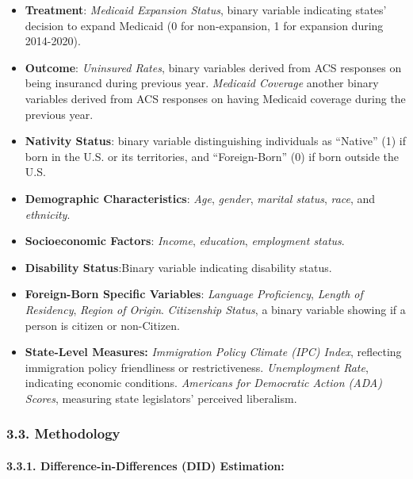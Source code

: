 \documentclass[
]{article}
\begin{document}
\begin{itemize}
\item
  \textbf{Treatment}: \emph{Medicaid Expansion Status}, binary variable
  indicating states' decision to expand Medicaid (0 for non-expansion, 1
  for expansion during 2014-2020).
\item
  \textbf{Outcome}: \emph{Uninsured Rates}, binary variables derived
  from ACS responses on being insurancd during previous year.
  \emph{Medicaid Coverage} another binary variables derived from ACS
  responses on having Medicaid coverage during the previous year.
\item
  \textbf{Nativity Status}: binary variable distinguishing individuals
  as ``Native'' (1) if born in the U.S. or its territories, and
  ``Foreign-Born'' (0) if born outside the U.S.
\item
  \textbf{Demographic Characteristics}: \emph{Age}, \emph{gender},
  \emph{marital status}, \emph{race}, and \emph{ethnicity}.
\item
  \textbf{Socioeconomic Factors}: \emph{Income}, \emph{education},
  \emph{employment status}.
\item
  \textbf{Disability Status}:Binary variable indicating disability
  status.
\item
  \textbf{Foreign-Born Specific Variables}: \emph{Language Proficiency},
  \emph{Length of Residency}, \emph{Region of Origin}. \emph{Citizenship
  Status}, a binary variable showing if a person is citizen or
  non-Citizen.
\item
  \textbf{State-Level Measures:} \emph{Immigration Policy Climate (IPC)
  Index}, reflecting immigration policy friendliness or restrictiveness.
  \emph{Unemployment Rate}, indicating economic conditions.
  \emph{Americans for Democratic Action (ADA) Scores}, measuring state
  legislators' perceived liberalism.
\end{itemize}

\hypertarget{methodology}{%
\subsubsection{3.3. Methodology}\label{methodology}}

\hypertarget{difference-in-differences-did-estimation}{%
\paragraph{3.3.1. Difference-in-Differences (DID)
Estimation:}\label{difference-in-differences-did-estimation}}
\end{document}
